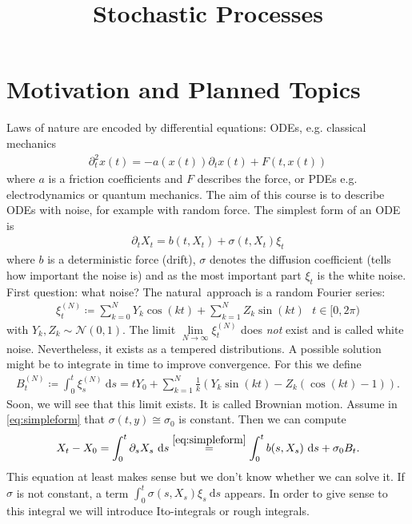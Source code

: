 \documentclass[10pt,a4paper]{report}
\title{Stochastic Processes}
\begin{document}
\maketitle
\chapter*{Motivation and Planned Topics}
Laws of nature are encoded by differential equations: ODEs, e.g. classical mechanics 
\begin{align*}
\partial_t^2 x(t)=-a(x(t))\partial_t x(t)+F(t,x(t))
\end{align*}
where $a$ is a friction coefficients and $F$ describes the force,
or PDEs e.g. electrodynamics or quantum mechanics.
The aim of this course is to describe ODEs with noise, for example with random force.
The simplest form of an ODE is
\begin{align}\label{eq:simpleform}
\partial_t X_t=b(t,X_t)+\sigma(t,X_t)\xi_t
\end{align}
where $b$ is a deterministic force (drift), $\sigma$ denotes the diffusion coefficient (tells how important the noise is) and as the most important part
$\xi_t$ is the white noise.
First question: what noise?
The \glqq natural\grqq\, approach is a random Fourier series:
\begin{align}
\xi_t^{(N)}\coloneqq \sum_{k=0}^N Y_k \cos(kt)+ \sum_{k=1}^N Z_k \sin(kt)~~~t\in [0,2\pi)
\end{align}
with $Y_k,Z_k \sim \mathcal{N}(0,1)$.
The limit $\lim\limits_{N\to \infty} \xi_t^{(N)}$ does \emph{not} exist and is called \glqq white noise\grqq.
Nevertheless, it exists as a tempered distributions.
A possible solution might be to integrate in time to improve convergence. For this we define
\begin{align}
B_t^{(N)}\coloneqq \int_0^t\xi_s^{(N)}~\mathrm{d}s=tY_0+\sum_{k=1}^N \frac{1}{k}(Y_k\sin(kt)-Z_k(\cos(kt)-1)).
\end{align}
Soon, we will see that this limit exists. It is called \glqq Brownian motion\grqq.
Assume in \eqref{eq:simpleform} that $\sigma(t,y)\cong \sigma_0$ is constant. Then we can compute
\begin{align*}
X_t-X_0=\int_0^t \partial_s X_s~\mathrm{d}s\overset{\eqref{eq:simpleform}}{=}\int_0^t b(s,X_s)~\mathrm{d}s+\sigma_0 B_t.
\end{align*}
This equation at least makes sense but we don't know whether we can solve it.
If $\sigma$ is not constant, a term $\int_0^t\sigma(s,X_s)\xi_s~\mathrm{d}s$ appears.
In order to give sense to this integral we will introduce Ito-integrals or rough integrals.
\end{document}
